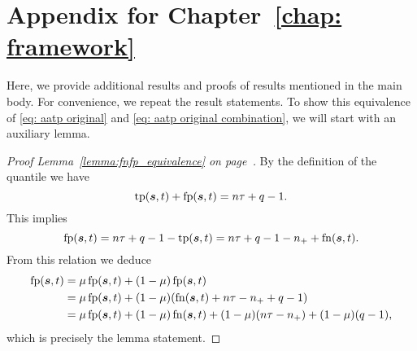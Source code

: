 \chapter{Appendix for Chapter~\ref{chap: framework}}

Here, we provide additional results and proofs of results mentioned in the main body. For convenience, we repeat the result statements. To show this equivalence of \eqref{eq: aatp original} and \eqref{eq: aatp original combination}, we will start with an auxiliary lemma.

\lemmaequivalence*
\begin{proof}[Proof Lemma~\ref{lemma:fnfp_equivalence} on page~\pageref{lemma:fnfp_equivalence}]
  By the definition of the quantile we have
  \begin{equation*}
    \operatorname{tp}(\bm{s},t)+\operatorname{fp}(\bm{s},t) = n\tau + q-1.
  \end{equation*}
  This implies
  \begin{equation*}
    \operatorname{fp}(\bm{s},t)=n\tau +q - 1-\operatorname{tp}(\bm{s},t) =n\tau+q-1-n_{+} +\operatorname{fn}(\bm{s},t).
  \end{equation*}
  From this relation we deduce
  \begin{equation*}
    \begin{aligned}
      \fp(\bm{s},t)
      & = \mu \fp(\bm{s},t) + (1 - \mu)\fp(\bm{s},t) \\
      & = \mu \fp(\bm{s},t) + (1 - \mu)\Brac{\fn(\bm{s},t) + n\tau - \npos + q - 1} \\
      & = \mu \fp(\bm{s},t) + (1 - \mu)\fn(\bm{s},t) + (1-\mu)\Brac{n\tau - \npos} + (1-\mu)\Brac{q - 1},
    \end{aligned}
  \end{equation*}
  which is precisely the lemma statement.
\end{proof}
